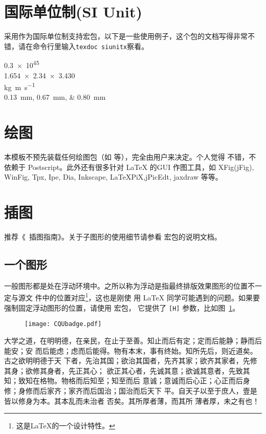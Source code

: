 \section{国际单位制(SI Unit)}

\cquthesis 采用作为国际单位制支持宏包，以下是一些使用例子，这个包的文档写得非常不错，请在命令行里输入\texttt{texdoc siunitx}察看。
\begin{center}
	\num{.3e45}\\
	\num{1.654 x 2.34 x 3.430}\\
	\si{\kilogram\metre\per\second}\\    
	\SIlist{0.13;0.67;0.80}{\milli\metre}
\end{center}


\section{绘图}
\label{sec:draw}

本模板不预先装载任何绘图包（如  等），完全由用户来决定。个人觉得  不错，不依赖于 Postscript。此外还有很多针对 \LaTeX{} 的GUI 作图工具，如 XFig(jFig), WinFig, Tpx, Ipe, Dia, Inkscape, LaTeXPiX,jPicEdt, jaxdraw 等等。

\section{插图}
\label{sec:graphs}

推荐《\LaTeXe\ 插图指南》。关于子图形的使用细节请参看  宏包的说明文档。

\subsection{一个图形}
\label{sec:onefig}
一般图形都是处在浮动环境中。之所以称为浮动是指最终排版效果图形的位置不一定与源文
件中的位置对应\footnote{这是\LaTeX 的一个设计特性。}，这也是刚使
用 \LaTeX{} 同学可能遇到的问题。如果要强制固定浮动图形的位置，请使用  宏包，
它提供了 \texttt{[H]} 参数，比如图~\ref{fig:xfig1}。
\begin{figure}[htb] %
	\centering
	\texttt{[image: CQUbadge.pdf]}
	\label{fig:xfig1}
\end{figure}

大学之道，在明明德，在亲民，在止于至善。知止而后有定；定而后能静；静而后能安；安
而后能虑；虑而后能得。物有本末，事有终始。知所先后，则近道矣。古之欲明明德于天
下者，先治其国；欲治其国者，先齐其家；欲齐其家者，先修其身；欲修其身者，先正其心；
欲正其心者，先诚其意；欲诚其意者，先致其知；致知在格物。物格而后知至；知至而后
意诚；意诚而后心正；心正而后身 修；身修而后家齐；家齐而后国治；国治而后天下
平。自天子以至于庶人，壹是皆以修身为本。其本乱而未治者 否矣。其所厚者薄，而其所
薄者厚，未之有也！

